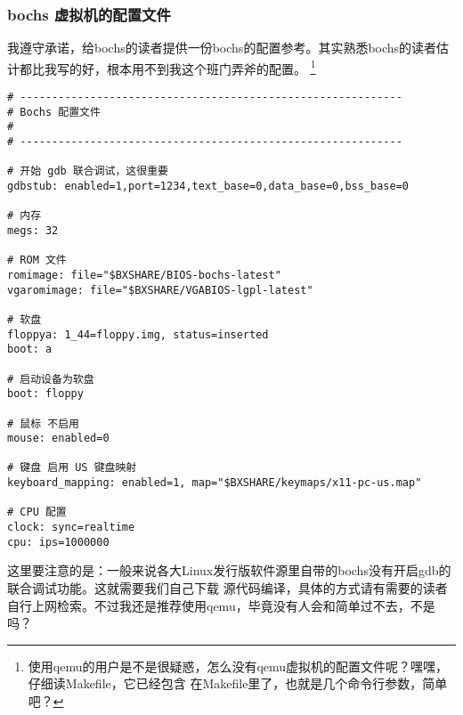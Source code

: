 \subsubsection{bochs 虚拟机的配置文件}
\par 我遵守承诺，给bochs的读者提供一份bochs的配置参考。其实熟悉bochs的读者估计都比我写的好，根本用不到我这个班门弄斧的配置。
\footnote{使用qemu的用户是不是很疑惑，怎么没有qemu虚拟机的配置文件呢？嘿嘿，仔细读Makefile，它已经包含\allowbreak
在Makefile里了，也就是几个命令行参数，简单吧？}

\begin{lstlisting}[caption = Bochs 的配置文件]
# ------------------------------------------------------------
# Bochs 配置文件
#
# ------------------------------------------------------------

# 开始 gdb 联合调试，这很重要
gdbstub: enabled=1,port=1234,text_base=0,data_base=0,bss_base=0

# 内存
megs: 32

# ROM 文件
romimage: file="$BXSHARE/BIOS-bochs-latest"
vgaromimage: file="$BXSHARE/VGABIOS-lgpl-latest"

# 软盘
floppya: 1_44=floppy.img, status=inserted
boot: a

# 启动设备为软盘
boot: floppy

# 鼠标 不启用
mouse: enabled=0

# 键盘 启用 US 键盘映射
keyboard_mapping: enabled=1, map="$BXSHARE/keymaps/x11-pc-us.map"

# CPU 配置
clock: sync=realtime
cpu: ips=1000000
\end{lstlisting}

\par 这里要注意的是：一般来说各大Linux发行版软件源里自带的bochs没有开启gdb的联合调试功能。这就需要我们自己下载\allowbreak
源代码编译，具体的方式请有需要的读者自行上网检索。不过我还是推荐使用qemu，毕竟没有人会和简单过不去，不是吗？
